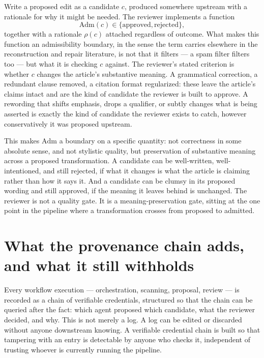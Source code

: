 \documentclass[11pt,openany]{book}
\begin{document}
Write a proposed edit as a candidate $c$, produced somewhere upstream with a rationale for why it might be needed. The reviewer implements a function
\[
\mathrm{Adm}(c) \in \{\text{approved}, \text{rejected}\},
\]
together with a rationale $\rho(c)$ attached regardless of outcome. What makes this function an admissibility boundary, in the sense the term carries elsewhere in the reconstruction and repair literature, is not that it filters — a spam filter filters too — but what it is checking $c$ against. The reviewer's stated criterion is whether $c$ changes the article's substantive meaning. A grammatical correction, a redundant clause removed, a citation format regularized: these leave the article's claims intact and are the kind of candidate the reviewer is built to approve. A rewording that shifts emphasis, drops a qualifier, or subtly changes what is being asserted is exactly the kind of candidate the reviewer exists to catch, however conservatively it was proposed upstream.

This makes $\mathrm{Adm}$ a boundary on a specific quantity: not correctness in some absolute sense, and not stylistic quality, but preservation of substantive meaning across a proposed transformation. A candidate can be well-written, well-intentioned, and still rejected, if what it changes is what the article is claiming rather than how it says it. And a candidate can be clumsy in its proposed wording and still approved, if the meaning it leaves behind is unchanged. The reviewer is not a quality gate. It is a meaning-preservation gate, sitting at the one point in the pipeline where a transformation crosses from proposed to admitted.

\section{What the provenance chain adds, and what it still withholds}

Every workflow execution — orchestration, scanning, proposal, review — is recorded as a chain of verifiable credentials, structured so that the chain can be queried after the fact: which agent proposed which candidate, what the reviewer decided, and why. This is not merely a log. A log can be edited or discarded without anyone downstream knowing. A verifiable credential chain is built so that tampering with an entry is detectable by anyone who checks it, independent of trusting whoever is currently running the pipeline.
\end{document}
